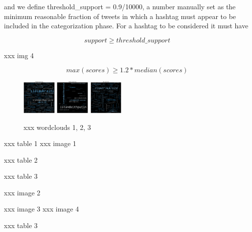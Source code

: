 \documentclass[sigchi]{acmart}
\begin{document}
and we define threshold\_support = 0.9/10000, a number manually set as the minimum reasonable fraction of tweets in which a hashtag must appear to be included in the categorization phase. 
For a hashtag to be considered it must have 

$$support \geq threshold\_support$$


xxx img 4


$$max(scores) \geq 1.2 * median(scores)$$



\begin{figure}[h]
\caption{xxx wordclouds 1, 2, 3}
\centering
\includegraphics[width=0.15\textwidth]{intro_21}
\includegraphics[width=0.15\textwidth]{intro_22}
\includegraphics[width=0.15\textwidth]{intro_23}
\end{figure}



xxx table 1
xxx image 1


xxx table 2


xxx table 3


xxx image 2


xxx image 3
xxx image 4


xxx table 3

\end{document}
